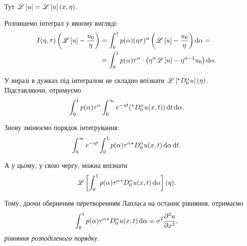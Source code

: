 \begin{remark}
    Тут $\mathscr{L}\left[u\right] = \mathscr{L}\left[u\right](x, \eta)$.
\end{remark}

Розпишемо інтеграл у явному вигляді:
\begin{equation}
    \begin{aligned}
        I(\eta, \tau) \left( \mathscr{L}\left[u\right] - \frac{u_0}{\eta} \right)
        &= \int_0^1 p(\alpha) (\eta \tau)^\alpha \left( \mathscr{L}\left[u\right] - \frac{u_0}{\eta} \right) \mathop{}\!\mathrm{d} \alpha = \\
        &= \int_0^1 p(\alpha) \tau^\alpha \cdot \left( \eta^\alpha \mathscr{L}\left[u\right] - \eta^{\alpha - 1} u_0 \right) \mathop{}\!\mathrm{d} \alpha.
    \end{aligned}
\end{equation}

У виразі в дужках під інтегралом не складно впізнати $\mathscr{L}\left[{}^\star D_0^\alpha u\right](\eta)$. Підставляючи, отримуємо
\begin{equation}
    \int_0^1 p(\alpha) \tau^\alpha \int_0^\infty e^{-\eta t} ({}^\star D_0^\alpha u(x, t)) \mathop{}\!\mathrm{d} t \mathop{}\!\mathrm{d} \alpha.
\end{equation}

Знову змінюємо порядок інтегрування:
\begin{equation}
    \int_0^\infty e^{-\eta t} \int_0^1 p(\alpha) \tau^\alpha {}^\star D_0^\alpha u(x, t) \mathop{}\!\mathrm{d} \alpha \mathop{}\!\mathrm{d} t.
\end{equation}

А у цьому, у свою чергу, можна впізнати
\begin{equation}
    \mathscr{L}\left[\int_0^1 p(\alpha) \tau^\alpha {}^\star D_0^\alpha u(x, t) \mathop{}\!\mathrm{d} \alpha \right](\eta).
\end{equation}

Тому, діючи оберненим перетворенням Лапласа на останнє рівняння, отримаємо
\begin{equation}
    \int_0^1 p(\alpha) \tau^\alpha {}^\star D_0^\alpha u(x, t) \mathop{}\!\mathrm{d} \alpha = \sigma^2 \frac{\partial^2 u}{\partial x^2},
\end{equation}
\textit{рівняння розподіленого порядку}.

